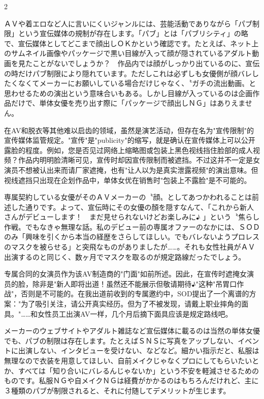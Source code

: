 \documentclass[12pt,UTF8]{ctexbook}
\begin{document}
\begin{paracol}{2}

ＡＶや着エロなど人に言いにくいジャンルには、芸能活動でありながら「パブ制限」という宣伝媒体の規制が存在します。「パブ」とは「パブリシティ」の略で、宣伝媒体としてどこまで顔出しＯＫかという確認です。たとえば、ネット上のサムネイル画像やパッケージで黒い目線が入って顔が隠されているアダルト動画を見たことがないでしょうか？　作品内では顔がしっかり出ているのに、宣伝の時だけパブ制限により隠れています。ただしこれは必ずしも女優側が顔バレしたくなくてメーカーにお願いしている場合だけじゃなく、〝ガチの流出動画〟と思わせるための演出という意味合いもある。しかし目線が入っているのは企画作品だけで、単体女優を売り出す際に「パッケージで顔出しＮＧ」はありえません。

\switchcolumn

在AV和脱衣等其他难以启齿的领域，虽然是演艺活动，但存在名为"宣传限制"的宣传媒体监管规定。"宣传"是"publicity"的缩写，就是确认在宣传媒体上可以公开露脸的程度。例如，您是否见过网络上缩略图或包装上黑色视线挡住脸部的成人视频？作品内明明脸清晰可见，宣传时却因宣传限制而被遮挡。不过这并不一定是女演员不想被认出来而请厂家遮掩，也有"让人以为是真实泄露视频"的演出意味。但视线遮挡只出现在企划作品中，单体女优在销售时"包装上不露脸"是不可能的。

\switchcolumn*

専属契約している女優がそのＡＶメーカーの〝顔〟としてあつかわれることは前述した通りです。よって、宣伝時にその女優の顏を隠すなんて、「これから新人さんがデビューします！　まだ見せられないけどお楽しみに♪ 」という〝焦らし作戦〟でもなきゃ無理な話。私のデビュー前の専属オファーのなかには、ＳＯＤのみ「興味を引くから本当の経歴をさらしてほしい。でもバレないようプロレスのマスクを被らせる」と突飛なものがありましたが……。それも女性社員がＡＶ出演するのと同じく、数ヶ月でマスクを取るのが規定路線だったでしょう。

\switchcolumn

专属合同的女演员作为该AV制造商的"门面"如前所述。因此，在宣传时遮掩女演员的脸，除非是"新人即将出道！虽然还不能展示但敬请期待♪"这种"吊胃口作战"，否则是不可能的。在我出道前收到的专属邀约中，SOD提出了一个离谱的方案："为了吸引关注，请公开真实经历。但为了不被发现，请戴上职业摔角的面具。"……和女性员工出演AV一样，几个月后摘下面具应该是规定路线吧。

\switchcolumn*

メーカーのウェブサイトやアダルト雑誌など宣伝媒体に載るのは当然の単体女優でも、パブの制限は存在します。たとえばＳＮＳに写真をアップしない、イベントに出演しない、インタビューを受けない、などなど。細かい指示だと、私服は無理なので衣装を用意してほしい、自前メイクじゃなくプロにしてもらいたいとか、すべては「知り合いにバレるんじゃないか」という不安を軽減させるためのものです。私服ＮＧや自メイクＮＧは経費がかかるのはもちろんだけれど、主に３種類のパブが制限されると、それに付随してデメリットが生じます。


\end{paracol}
\end{document}
